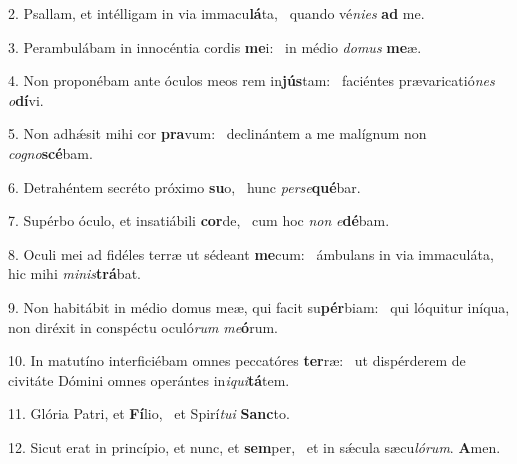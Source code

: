 2. Psallam, et intélligam in via immacu\textbf{lá}ta, \ast\  quando vé\textit{ni}\textit{es} \textbf{ad} me.\

3. Perambulábam in innocéntia cordis \textbf{me}i: \ast\  in médio \textit{do}\textit{mus} \textbf{me}æ.\

4. Non proponébam ante óculos meos rem in\textbf{jús}tam: \ast\  faciéntes prævaricatió\textit{nes} \textit{o}\textbf{dí}vi.\

5. Non adhǽsit mihi cor \textbf{pra}vum: \ast\  declinántem a me malígnum non \textit{co}\textit{gno}\textbf{scé}bam.\

6. Detrahéntem secréto próximo \textbf{su}o, \ast\  hunc \textit{per}\textit{se}\textbf{qué}bar.\

7. Supérbo óculo, et insatiábili \textbf{cor}de, \ast\  cum hoc \textit{non} \textit{e}\textbf{dé}bam.\

8. Oculi mei ad fidéles terræ ut sédeant \textbf{me}cum: \ast\  ámbulans in via immaculáta, hic mihi \textit{mi}\textit{nis}\textbf{trá}bat.\

9. Non habitábit in médio domus meæ, qui facit su\textbf{pér}biam: \ast\  qui lóquitur iníqua, non diréxit in conspéctu oculó\textit{rum} \textit{me}\textbf{ó}rum.\

10. In matutíno interficiébam omnes peccatóres \textbf{ter}ræ: \ast\  ut dispérderem de civitáte Dómini omnes operántes in\textit{i}\textit{qui}\textbf{tá}tem.\

11. Glória Patri, et \textbf{Fí}lio, \ast\  et Spirí\textit{tu}\textit{i} \textbf{Sanc}to.\

12. Sicut erat in princípio, et nunc, et \textbf{sem}per, \ast\  et in sǽcula sæcu\textit{ló}\textit{rum}. \textbf{A}men.\


